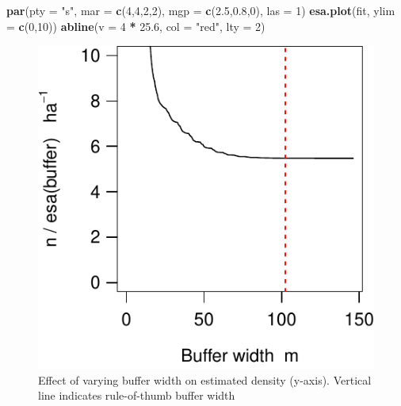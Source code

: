 \documentclass[
]{book}
\newenvironment{Shaded}{\begin{snugshade}}{\end{snugshade}}
\newcommand{\AttributeTok}[1]{\textcolor[rgb]{0.13,0.29,0.53}{#1}}
\newcommand{\DecValTok}[1]{\textcolor[rgb]{0.00,0.00,0.81}{#1}}
\newcommand{\FloatTok}[1]{\textcolor[rgb]{0.00,0.00,0.81}{#1}}
\newcommand{\FunctionTok}[1]{\textcolor[rgb]{0.13,0.29,0.53}{\textbf{#1}}}
\newcommand{\NormalTok}[1]{#1}
\newcommand{\SpecialCharTok}[1]{\textcolor[rgb]{0.81,0.36,0.00}{\textbf{#1}}}
\newcommand{\StringTok}[1]{\textcolor[rgb]{0.31,0.60,0.02}{#1}}
\begin{document}
\begin{Shaded}
\begin{Highlighting}[]
\FunctionTok{par}\NormalTok{(}\AttributeTok{pty =} \StringTok{"s"}\NormalTok{, }\AttributeTok{mar =} \FunctionTok{c}\NormalTok{(}\DecValTok{4}\NormalTok{,}\DecValTok{4}\NormalTok{,}\DecValTok{2}\NormalTok{,}\DecValTok{2}\NormalTok{), }\AttributeTok{mgp =} \FunctionTok{c}\NormalTok{(}\FloatTok{2.5}\NormalTok{,}\FloatTok{0.8}\NormalTok{,}\DecValTok{0}\NormalTok{), }\AttributeTok{las =} \DecValTok{1}\NormalTok{)}
\FunctionTok{esa.plot}\NormalTok{(fit, }\AttributeTok{ylim =} \FunctionTok{c}\NormalTok{(}\DecValTok{0}\NormalTok{,}\DecValTok{10}\NormalTok{))}
\FunctionTok{abline}\NormalTok{(}\AttributeTok{v =} \DecValTok{4} \SpecialCharTok{*} \FloatTok{25.6}\NormalTok{, }\AttributeTok{col =} \StringTok{"red"}\NormalTok{, }\AttributeTok{lty =} \DecValTok{2}\NormalTok{)}
\end{Highlighting}
\end{Shaded}

\begin{figure}

{\centering \includegraphics{SECRbook_files/figure-latex/habitatesaplot-1} 

}

\caption{Effect of varying buffer width on estimated density (y-axis). Vertical line indicates rule-of-thumb buffer width}\label{fig:habitatesaplot}
\end{figure}
\end{document}
